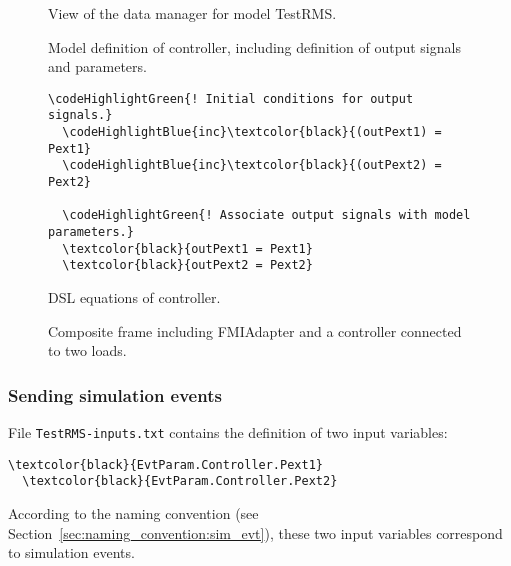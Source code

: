 \begin{figure}[h!]
\caption{View of the data manager for \pf model TestRMS.}
\label{fig:example_rms_model_browser}
\end{figure}

\begin{figure}[h!]
\vspace*{1em}
\caption{Model definition of controller, including definition of output signals and parameters.}
\label{fig:controller_for_two_loads}
\end{figure}

\begin{figure}[h!]
\vspace*{2em}
\begin{Verbatim}[frame=single,commandchars=\\\{\}]
  \codeHighlightGreen{! Initial conditions for output signals.}
  \codeHighlightBlue{inc}\textcolor{black}{(outPext1) = Pext1}
  \codeHighlightBlue{inc}\textcolor{black}{(outPext2) = Pext2}

  \codeHighlightGreen{! Associate output signals with model parameters.}
  \textcolor{black}{outPext1 = Pext1}
  \textcolor{black}{outPext2 = Pext2}
\end{Verbatim}
\vspace*{-2ex}
\caption{DSL equations of controller.}
\label{fig:controller_for_two_loads_equ}
\end{figure}


\begin{figure}[h!]
\vspace*{1em}
\caption{Composite frame including \dslmodel FMIAdapter and a controller connected to two loads.}
\label{fig:fmiadapterconfig_composite_frame_2}
\end{figure}

\clearpage

\subsubsection*{Sending simulation events}

File \texttt{TestRMS-inputs.txt} contains the definition of two input variables:
\begin{Verbatim}[frame=single,commandchars=\\\{\}]
  \textcolor{black}{EvtParam.Controller.Pext1}
  \textcolor{black}{EvtParam.Controller.Pext2}
\end{Verbatim}
According to the naming convention (see Section~\ref{sec:naming_convention:sim_evt}), these two input variables correspond to simulation events.

